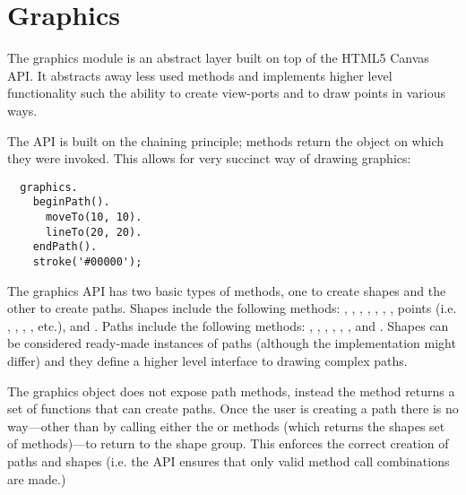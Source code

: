 \section{Graphics}
The graphics module is an abstract layer built on top of the HTML5 Canvas API. It abstracts away less used methods and implements higher level functionality such the ability to create view-ports and to draw points in various ways.

The API is built on the chaining principle; methods return the object on which they were invoked. This allows for very succinct way of drawing graphics:
\begin{verbatim}
  graphics.
    beginPath().
      moveTo(10, 10).
	  lineTo(20, 20).
    endPath().
    stroke('#00000');
\end{verbatim}
The graphics API has two basic types of methods, one to create shapes and the other to create paths. Shapes include the following methods: , , , , , , , points (i.e. , , , , etc.), and . Paths include the following methods: , , , , , , and . Shapes can be considered ready-made instances of paths (although the implementation might differ) and they define a higher level interface to drawing complex paths.

The graphics object does not expose path methods, instead the  method returns a set of functions that can create paths. Once the user is creating a path there is no way---other than by calling either the  or  methods (which returns the shapes set of methods)---to return to the shape group. This enforces the correct creation of paths and shapes (i.e. the API ensures that only valid method call combinations are made.)

